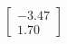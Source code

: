 \documentclass[preview]{standalone}
\begin{document}
\begin{align*}
\begin{bmatrix} -3.47 \\ 1.70 \end{bmatrix}
\end{align*}
\end{document}
